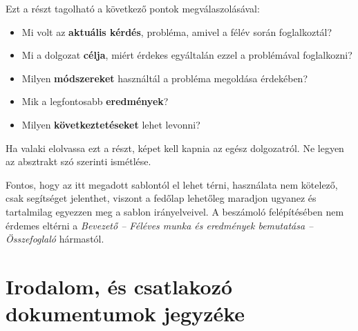 \documentclass[a4paper,oneside]{article}
\begin{document}
Ezt a részt tagolható a következő pontok megválaszolásával:
\begin{itemize}
\item Mi volt az \textbf{aktuális kérdés}, probléma, amivel a félév
  során foglalkoztál?
\item Mi a dolgozat \textbf{célja}, miért érdekes egyáltalán ezzel a
  problémával foglalkozni?
\item Milyen \textbf{módszereket} használtál a probléma megoldása
  érdekében?
\item Mik a legfontosabb \textbf{eredmények}?
\item Milyen \textbf{következtetéseket} lehet levonni?

\end{itemize}

Ha valaki elolvassa ezt a részt, képet kell kapnia az egész
dolgozatról.  Ne legyen az absztrakt szó szerinti ismétlése.

Fontos, hogy az itt megadott sablontól el lehet térni, használata nem
kötelező, csak segítséget jelenthet, viszont a fedőlap lehetőleg
maradjon ugyanez és tartalmilag egyezzen meg a sablon irányelveivel. A
beszámoló felépítésében nem érdemes eltérni a \emph{Bevezető --
  Féléves munka és eredmények bemutatása -- Összefoglaló} hármastól.

\newpage

\section{Irodalom, és csatlakozó dokumentumok jegyzéke}
\label{sec:irod-es-csatl}
\end{document}
